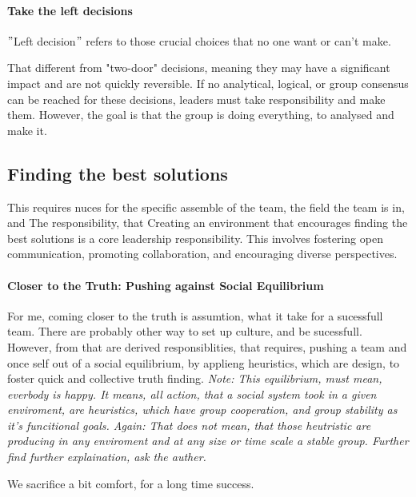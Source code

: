 \paragraph{Take the left decisions}
$"$Left decision$"$ refers to those crucial choices that no one want or can't make.

That different from "two-door" decisions, meaning they may have a significant impact and are not quickly reversible. If no analytical, logical, or group consensus can be reached for these decisions, leaders must take responsibility and make them. However, the goal is that the group is doing everything, to analysed and make it.


\subsection{Finding the best solutions} \label{responsibility__finding}
This requires nuces for the specific assemble of the team, the field the team is in, and 
The responsibility, that 
Creating an environment that encourages finding the best solutions is a core leadership responsibility. This involves fostering open communication, promoting collaboration, and encouraging diverse perspectives.

\paragraph{Closer to the Truth: Pushing against Social Equilibrium}
For me, coming closer to the truth is assumtion, what it take for a sucessfull team. There are probably other way to set up culture, and be sucessfull. However, from that are derived responsiblities, that requires, pushing a team and once self out of a social equilibrium, by applieng heuristics, which are design, to foster quick and collective truth finding.   \textit{Note: This equilibrium, must mean, everbody is happy. It means, all action, that a social system took in a given enviroment, are heuristics, which have group cooperation, and group stability as it's funcitional goals. Again: That does not mean, that those heutristic are producing in any enviroment and at any size or time scale a stable group. Further find further explaination, ask the auther.}
\begin{center}
We sacrifice a bit comfort, for a long time success.
\end{center}

